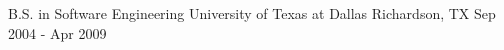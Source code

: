 

\begin{cventries}

  \cventry
    {B.S. in Software Engineering} %
    {University of Texas at Dallas} %
    {Richardson, TX} %
    {Sep 2004 - Apr 2009} %
    {
      \begin{cvitems} %
      \end{cvitems}
    }

\end{cventries}
